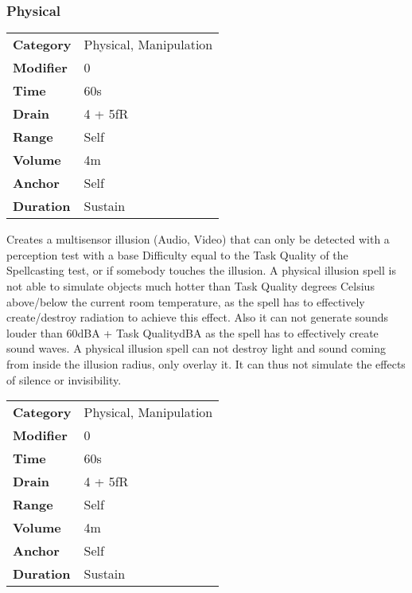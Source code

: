\subsubsection{Physical}


\begin{tabular}{ll}
    \textbf{Category} & Physical, Manipulation \\
    \textbf{Modifier} & 0                      \\
    \textbf{Time}     & 60s                    \\
    \textbf{Drain}    & 4 + 5fR                \\
    \textbf{Range}    & Self                   \\
    \textbf{Volume}   & 4m                     \\
    \textbf{Anchor}   & Self                   \\
    \textbf{Duration} & Sustain                \\
\end{tabular}

\hfil

Creates a multisensor illusion (Audio, Video) that can only be
detected with a perception test with a base Difficulty equal to the
Task Quality of the
Spellcasting test, or if somebody touches the
illusion. A physical illusion spell is not able to simulate objects much
hotter than Task Quality degrees Celsius
above/below the current room temperature, as the spell has to
effectively create/destroy radiation to achieve this effect. Also it can
not generate sounds louder than 60dBA + Task
QualitydBA as the spell has to effectively
create sound waves. A physical illusion spell can not destroy light and
sound coming from inside the illusion radius, only overlay it. It can
thus not simulate the effects of silence or invisibility.



\begin{tabular}{ll}
    \textbf{Category} & Physical, Manipulation \\
    \textbf{Modifier} & 0                      \\
    \textbf{Time}     & 60s                    \\
    \textbf{Drain}    & 4 + 5fR                \\
    \textbf{Range}    & Self                   \\
    \textbf{Volume}   & 4m                     \\
    \textbf{Anchor}   & Self                   \\
    \textbf{Duration} & Sustain                \\
\end{tabular}

